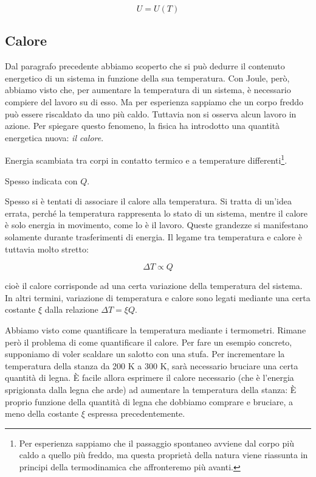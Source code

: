 \[ U = U(T) \]

\subsection{Calore}
Dal paragrafo precedente abbiamo scoperto che si può dedurre il
contenuto energetico di un sistema in funzione della sua temperatura.
Con Joule, però, abbiamo visto che, per aumentare la temperatura di
un sistema, è necessario compiere del lavoro su di esso. Ma per
esperienza sappiamo che un corpo freddo può essere riscaldato da uno
più caldo. Tuttavia non si osserva alcun lavoro in azione. Per
spiegare questo fenomeno, la fisica ha introdotto una quantità
energetica nuova: \textit{il calore}.

\begin{tcolorbox}[colback = red!30, colframe = red!30!black, title = {Calore}]
Energia scambiata tra corpi in contatto termico e a temperature
differenti\footnote{Per esperienza sappiamo che il passaggio spontaneo avviene
dal corpo più caldo a quello più freddo, ma questa proprietà della natura viene riassunta in principi della termodinamica che affronteremo più avanti.}.

Spesso indicata con $Q$.
\end{tcolorbox}

Spesso si è tentati di associare il calore alla temperatura. Si
tratta di un'idea errata, perché la temperatura rappresenta lo
stato di un sistema, mentre il calore è solo energia in movimento,
come lo è il lavoro. Queste grandezze si manifestano solamente
durante trasferimenti di energia. Il legame tra temperatura e calore
è tuttavia molto stretto:

\[ \Delta T \propto Q \]

\noindent cioè il calore corrisponde ad una certa variazione della temperatura
del sistema. In altri termini, variazione di temperatura e calore sono legati
mediante una certa costante $\xi$ dalla relazione $\Delta T = \xi Q$.

Abbiamo visto come quantificare la temperatura mediante i termometri. Rimane
però il problema di come quantificare il calore. Per fare un
esempio concreto, supponiamo di voler scaldare un salotto con una stufa. Per
incrementare la temperatura della stanza da 200 K a 300 K, sarà necessario
bruciare una certa quantità di legna. È facile allora esprimere il calore
necessario (che è l'energia sprigionata dalla legna che arde) ad aumentare
la temperatura della stanza: È proprio funzione della quantità di legna che dobbiamo
comprare e bruciare, a meno della costante $\xi$ espressa precedentemente.

